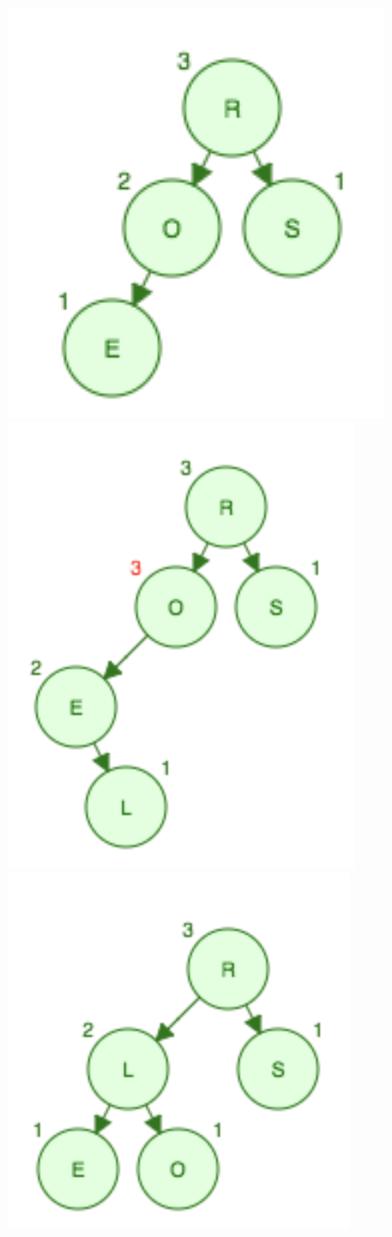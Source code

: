 \documentclass[a5paper,10pt,oneside]{article}
\begin{document}
\includegraphics[scale=0.3]{Dub1}
\includegraphics[scale=0.3]{Dub2}
\includegraphics[scale=0.3]{Dub3}
\end{document}
